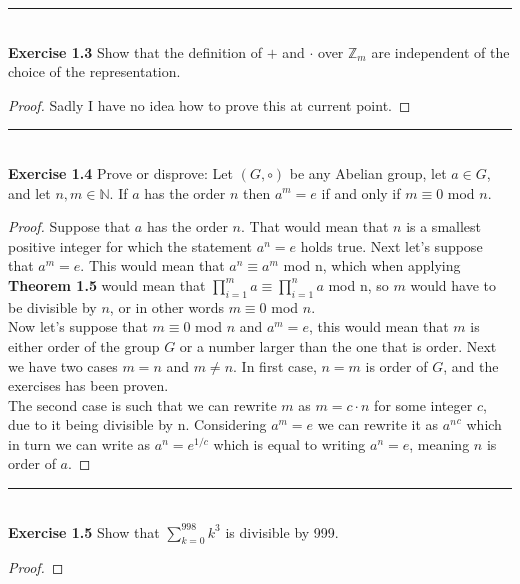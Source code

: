 \documentclass{article}
\begin{document}
\noindent\rule{12cm}{0.4pt}\\
\noindent \textbf{Exercise 1.3} Show that the definition of $+$ and $\cdot$ over $\mathbb{Z}_m$ are independent of the choice of the representation.
\begin{proof}
Sadly I have no idea how to prove this at current point.
\end{proof}
\noindent\rule{12cm}{0.4pt}\\
\noindent \textbf{Exercise 1.4} Prove or disprove: Let $(G, \circ)$ be any Abelian group, let $a \in G$, and let $n, m \in \mathbb{N}$. If $a$ has the order $n$ then $a^m=e$ if and only if $m \equiv 0$ mod $n$.
\begin{proof}
Suppose that $a$ has the order $n$. That would mean that $n$ is a smallest positive integer for which the statement $a^n=e$ holds true. Next let's suppose that $a^m=e$. This would mean that $a^n \equiv a^m$ mod n, which when applying \textbf{Theorem 1.5} would mean that $\prod_{i=1}^{m} a \equiv \prod_{i=1}^{n} a$ mod n, so $m$ would have to be divisible by $n$, or in other words $m \equiv 0$ mod $n$.\\
Now let's suppose that $m \equiv 0$ mod $n$ and $a^m=e$, this would mean that $m$ is either order of the group $G$ or a number larger than the one that is order. Next we have two cases $m=n$ and $m \neq n$. In first case, $n=m$ is order of $G$, and the exercises has been proven.\\
The second case is such that we can rewrite $m$ as $m=c\cdot n$ for some integer $c$, due to it being divisible by n. Considering $a^m=e$ we can rewrite it as ${a^n}^c$ which in turn we can write as $a^n=e^{1/c}$ which is equal to writing $a^n=e$, meaning $n$ is order of $a$.
\end{proof}
\noindent\rule{12cm}{0.4pt}\\
\noindent \textbf{Exercise 1.5} Show that $\sum_{k=0}^{998} k^{3}$ is divisible by 999.
\begin{proof}
	
\end{proof}
\end{document}
